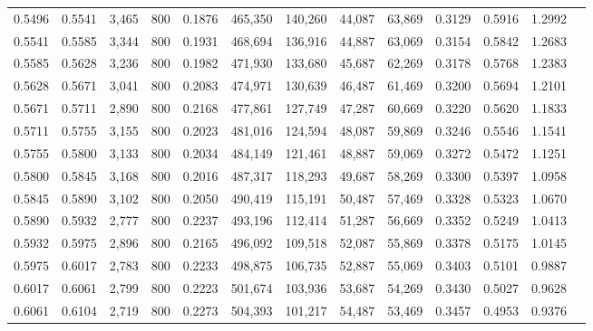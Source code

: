 \begin{tabular}{rrrrrrrrrrrrr}
0.5496 & 0.5541 &  3,465 &   800 &                                     0.1876 & 465,350 & 140,260 &  44,087 &  63,869 & 0.3129 & 0.5916 & 1.2992 \\
0.5541 & 0.5585 &  3,344 &   800 &                                     0.1931 & 468,694 & 136,916 &  44,887 &  63,069 & 0.3154 & 0.5842 & 1.2683 \\
0.5585 & 0.5628 &  3,236 &   800 &                                     0.1982 & 471,930 & 133,680 &  45,687 &  62,269 & 0.3178 & 0.5768 & 1.2383 \\
0.5628 & 0.5671 &  3,041 &   800 &                                     0.2083 & 474,971 & 130,639 &  46,487 &  61,469 & 0.3200 & 0.5694 & 1.2101 \\
0.5671 & 0.5711 &  2,890 &   800 &                                     0.2168 & 477,861 & 127,749 &  47,287 &  60,669 & 0.3220 & 0.5620 & 1.1833 \\
0.5711 & 0.5755 &  3,155 &   800 &                                     0.2023 & 481,016 & 124,594 &  48,087 &  59,869 & 0.3246 & 0.5546 & 1.1541 \\
0.5755 & 0.5800 &  3,133 &   800 &                                     0.2034 & 484,149 & 121,461 &  48,887 &  59,069 & 0.3272 & 0.5472 & 1.1251 \\
0.5800 & 0.5845 &  3,168 &   800 &                                     0.2016 & 487,317 & 118,293 &  49,687 &  58,269 & 0.3300 & 0.5397 & 1.0958 \\
0.5845 & 0.5890 &  3,102 &   800 &                                     0.2050 & 490,419 & 115,191 &  50,487 &  57,469 & 0.3328 & 0.5323 & 1.0670 \\
0.5890 & 0.5932 &  2,777 &   800 &                                     0.2237 & 493,196 & 112,414 &  51,287 &  56,669 & 0.3352 & 0.5249 & 1.0413 \\
0.5932 & 0.5975 &  2,896 &   800 &                                     0.2165 & 496,092 & 109,518 &  52,087 &  55,869 & 0.3378 & 0.5175 & 1.0145 \\
0.5975 & 0.6017 &  2,783 &   800 &                                     0.2233 & 498,875 & 106,735 &  52,887 &  55,069 & 0.3403 & 0.5101 & 0.9887 \\
0.6017 & 0.6061 &  2,799 &   800 &                                     0.2223 & 501,674 & 103,936 &  53,687 &  54,269 & 0.3430 & 0.5027 & 0.9628 \\
0.6061 & 0.6104 &  2,719 &   800 &                                     0.2273 & 504,393 & 101,217 &  54,487 &  53,469 & 0.3457 & 0.4953 & 0.9376 \\

\end{tabular}
